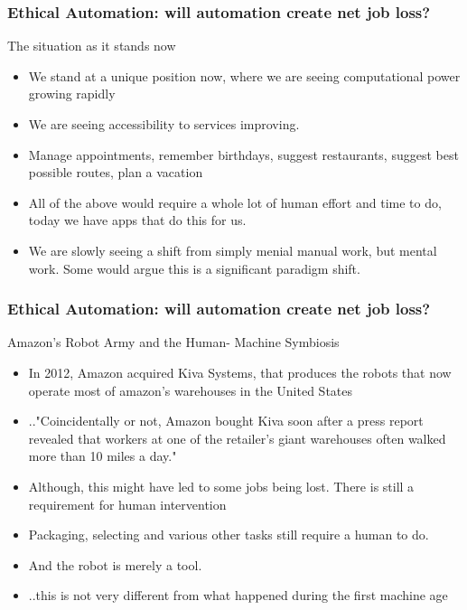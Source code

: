 \begin{frame}
  \frametitle{Ethical Automation: will automation create net job loss? }
  {\Large The situation as it stands now}
  \begin{itemize}
    \item We stand at a unique position now, where we are seeing computational power growing rapidly
    \item We are seeing accessibility to services improving.
    \item Manage appointments, remember birthdays, suggest restaurants, suggest best possible routes, plan a vacation
    \item All of the above would require a whole lot of human effort and time to do, today we have apps that do this for us. 
    \item We are slowly seeing a shift from simply menial manual work, but mental work. Some would argue this is a significant paradigm shift.
      
  \end{itemize}
\end{frame}
\begin{frame}
  \frametitle{Ethical Automation: will automation create net job loss? }
  {\Large Amazon's Robot Army and the Human- Machine Symbiosis}
  \begin{itemize}
    \item In 2012, Amazon acquired Kiva Systems, that produces the robots that now operate most of amazon's warehouses in the United States
    \item .."Coincidentally or not, Amazon bought Kiva soon after a press report revealed that workers at one of the retailer’s giant warehouses often walked more than 10 miles a day."
    \item Although, this might have led to some jobs being lost. There is still a requirement for human intervention
    \item Packaging, selecting and various other tasks still require a human to do.
    \item And the robot is merely a tool.
    \item ..this is not very different from what happened during the first machine age
  \end{itemize}
\end{frame}

